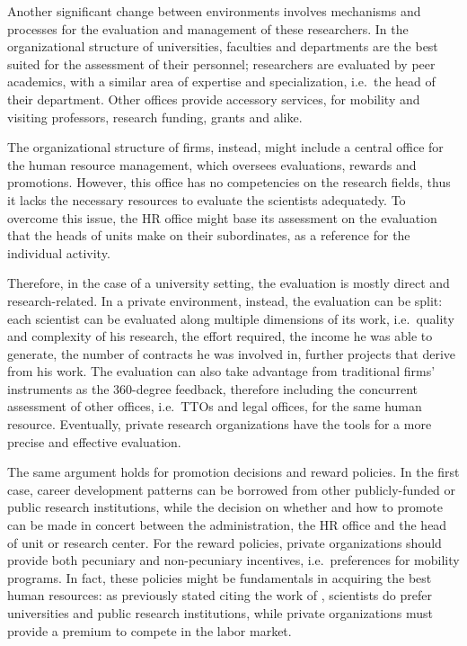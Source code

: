 Another significant change between environments involves mechanisms and processes for the evaluation and management of these researchers. In the organizational structure of universities, faculties and departments are the best suited for the assessment of their personnel; researchers are evaluated by peer academics, with a similar area of expertise and specialization, i.e.\ the head of their department. Other offices provide accessory services, for mobility and visiting professors, research funding, grants and alike.

The organizational structure of firms, instead, might include a central office for the human resource management, which oversees evaluations, rewards and promotions. However, this office has no competencies on the research fields, thus it lacks the necessary resources to evaluate the scientists adequatedy. To overcome this issue, the HR office might base its assessment on the evaluation that the heads of units make on their subordinates, as a reference for the individual activity.

Therefore, in the case of a university setting, the evaluation is mostly direct and research-related. In a private environment, instead, the evaluation can be split: each scientist can be evaluated along multiple dimensions of its work, i.e.\ quality and complexity of his research, the effort required, the income he was able to generate, the number of contracts he was involved in, further projects that derive from his work. The evaluation can also take advantage from traditional firms' instruments as the 360-degree feedback, therefore including the concurrent assessment of other offices, i.e.\ TTOs and legal offices, for the same human resource. Eventually, private research organizations have the tools for a more precise and effective evaluation.

The same argument holds for promotion decisions and reward policies. In the first case, career development patterns can be borrowed from other publicly-funded or public research institutions, while the decision on whether and how to promote can be made in concert between the administration, the HR office and the head of unit or research center. For the reward policies, private organizations should provide both pecuniary and non-pecuniary incentives, i.e.\ preferences for mobility programs. In fact, these policies might be fundamentals in acquiring the best human resources: as previously stated citing the work of \citet{Stern2004}, scientists do prefer universities and public research institutions, while private organizations must provide a premium to compete in the labor market.

